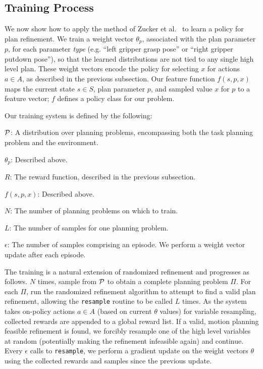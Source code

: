\subsection{Training Process}
We now show how to apply the method of Zucker et al.~\cite{workspacebias} to learn a policy
for plan refinement. We train a weight vector $\theta_{p}$, associated with the
plan parameter $p$, for each parameter \emph{type} (e.g. ``left gripper grasp pose'' or ``right
gripper putdown pose''), so that the learned distributions are not tied to any single
high level plan. These weight vectors encode the policy for selecting $x$ for actions $a \in A$,
as described in the previous subsection. Our feature function $f(s, p, x)$ maps the current
state $s \in S$, plan parameter $p$, and sampled value $x$ for $p$ to a feature vector; $f$
defines a policy class for our problem.

Our training system is defined by the following:
\begin{tightlist}
\item[$\mathcal{P}$:] A distribution over planning problems, encompassing both
the task planning problem and the environment.
\item[$\theta_{p}$:] Described above.
\item[$R$:] The reward function, described in the previous subsection.
\item[$f(s, p, x)$:] Described above.
\item[$N$:] The number of planning problems on which to train.
\item[$L$:] The number of samples for one planning problem.
\item[$\epsilon$:] The number of samples comprising an episode. We perform
a weight vector update after each episode.
\end{tightlist}

The training is a natural extension of randomized
refinement and progresses as follows. $N$ times, sample from $\mathcal{P}$ to obtain
a complete planning problem $\Pi$. For each $\Pi$, run the randomized refinement
algorithm to attempt to find a valid plan refinement, allowing the \texttt{resample}
routine to be called $L$ times. As the system takes on-policy actions $a \in A$ (based on
current $\theta$ values) for variable resampling, collected
rewards are appended to a global reward list. If a valid, motion planning
feasible refinement is found, we forcibly resample one of
the high level variables at random (potentially making the refinement infeasible again)
and continue. Every $\epsilon$ calls to
\texttt{resample}, we perform a gradient update on the weight vectors $\theta$ using the
collected rewards and samples since the previous update.

